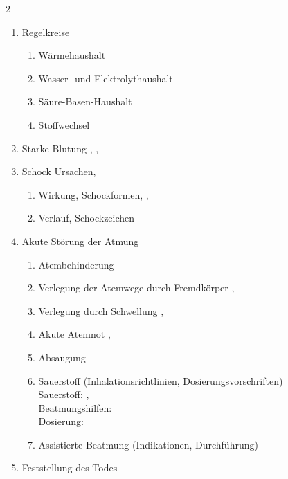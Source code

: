 \begin{WidePar}
\begin{multicols}{2}
\begin{enumerate}
    \item    Regelkreise
    \begin{enumerate}
      \item      Wärmehaushalt \dotfill {}
      \item      Wasser- und Elektrolythaushalt \dotfill  {}
      \item      Säure-Basen-Haushalt \dotfill  {}
      \item      Stoffwechsel \dotfill {}
    \end{enumerate}
    \item
    Starke Blutung \dotfill {},
    ,
    \item
    Schock Ursachen, \dotfill  {}
    \begin{enumerate}
      \item      Wirkung, Schockformen, \dotfill  {}, 
      \item      Verlauf, Schockzeichen \dotfill  {}
    \end{enumerate}
    \item Akute Störung der Atmung
    \begin{enumerate}
      \item      Atembehinderung \dotfill {}
      \item      Verlegung der Atemwege  durch Fremdkörper \dotfill {},
      \item      Verlegung durch Schwellung \dotfill {},
      \item      Akute Atemnot \dotfill {},
      \item      Absaugung \dotfill  {}
      \item      Sauerstoff (Inhalationsrichtlinien, Dosierungsvorschriften)
      \\
      Sauerstoff:  \dotfill {},\\
      Beatmungshilfen:  \dotfill {}\\
      Dosierung:  \dotfill {}
      \item      Assistierte Beatmung (Indikationen, Durchführung) \dotfill {}
    \end{enumerate}
    \item    Feststellung des Todes \dotfill {}
  \end{enumerate}
  


\end{multicols}
\end{WidePar}
